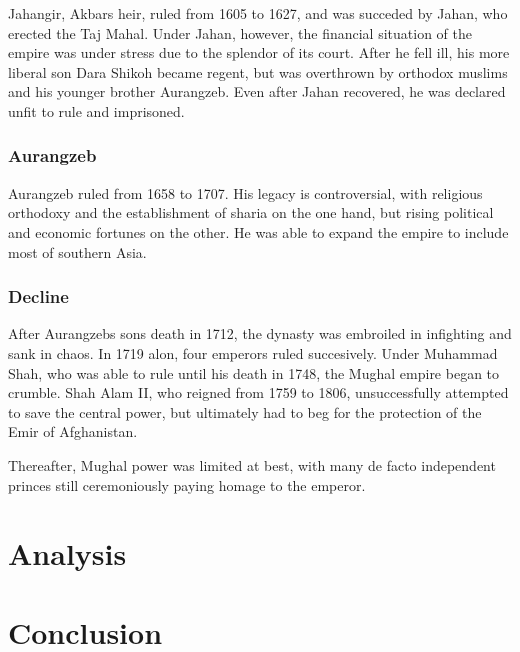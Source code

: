 \documentclass[11pt, a4paper, headings=standardclasses]{scrartcl}
\begin{document}
Jahangir, Akbars heir, ruled from 1605 to 1627, and was succeded by Jahan, who erected the Taj Mahal. Under Jahan, however, the financial situation of the empire was under stress due to the splendor of its court.\autocite[Chapter 6]{richards} After he fell ill, his more liberal son Dara Shikoh became regent, but was overthrown by orthodox muslims and his younger brother Aurangzeb. Even after Jahan recovered, he was declared unfit to rule and imprisoned.

\subsubsection{Aurangzeb}

Aurangzeb ruled from 1658 to 1707\autocite[165]{richards}. His legacy is controversial, with religious orthodoxy and the establishment of sharia on the one hand, but rising political and economic fortunes on the other. He was able to expand the empire to include most of southern Asia.\autocite[Chapter 8]{richards}

\subsubsection{Decline}

After Aurangzebs sons death in 1712, the dynasty was embroiled in infighting and sank in chaos. In 1719 alon, four emperors ruled succesively. Under Muhammad Shah, who was able to rule until his death in 1748, the Mughal empire began to crumble. Shah Alam II, who reigned from 1759 to 1806, unsuccessfully attempted to save the central power, but ultimately had to beg for the protection of the Emir of Afghanistan.

Thereafter, Mughal power was limited at best, with many de facto independent princes still ceremoniously paying homage to the emperor.

\section{Analysis}
\section{Conclusion}
\clearpage
\appendix
\printbibliography
\end{document}
